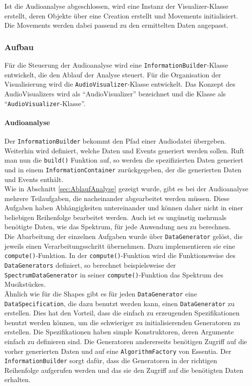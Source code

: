\documentclass[11pt,a4paper]{article}
\begin{document}
Ist die Audioanalyse abgeschlossen, wird eine Instanz der Visualizer-Klasse erstellt, deren Objekte über eine Creation erstellt und Movements initialisiert. Die Movements werden dabei passend zu den ermittelten Daten angepasst.

\subsubsection{Aufbau}
Für die Steuerung der Audioanalyse wird eine \lstinline!InformationBuilder!-Klasse entwickelt, die den Ablauf der Analyse steuert. Für die Organisation der Visualisierung wird die \lstinline!AudioVisualizer!-Klasse entwickelt. Das Konzept des AudioVisualizers wird als ``AudioVisualizer'' bezeichnet und die Klasse als ``\lstinline!AudioVisualizer!-Klasse''.

\paragraph{Audioanalyse}
Der \lstinline!InformationBuilder! bekommt den Pfad einer Audiodatei übergeben. Weiterhin wird definiert, welche Daten und Events generiert werden sollen. Ruft man nun die \lstinline!build()! Funktion auf, so werden die spezifizierten Daten generiert und in einem \lstinline!InformationContainer! zurückgegeben, der die generierten Daten und Events enthält.\\
Wie in Abschnitt \ref{sec:AblaufAnalyse} gezeigt wurde, gibt es bei der Audioanalyse mehrere Teilaufgaben, die nacheinander abgearbeitet werden müssen. Diese Aufgaben haben Abhängigkeiten untereinander und können daher nicht in einer beliebigen Reihenfolge bearbeitet werden. Auch ist es ungünstig mehrmals benötigte Daten, wie das Spektrum, für jede Anwendung neu zu berechnen.\\
Die Abarbeitung der einzelnen Aufgaben wurde über \lstinline!DataGenerator! gelöst, die jeweils einen Verarbeitungsschritt übernehmen. Dazu implementieren sie eine \lstinline!compute()!-Funktion. In der \lstinline!compute()!-Funktion wird die Funktionsweise des \lstinline!DataGenerators! definiert, so berechnet beispielsweise der \lstinline!SpectrumDataGenerator! in seiner \lstinline!compute()!-Funktion das Spektrum des Musikstückes.\\
Ähnlich wie für die Shapes gibt es für jeden \lstinline!DataGenerator! eine \lstinline!DataSpecification!, die dazu benutzt werden kann, einen \lstinline!DataGenerator! zu erstellen. Dies hat den Vorteil, dass die einfach zu erzeugenden Spezifikationen benutzt werden können, um die schwieriger zu initialisierenden Generatoren zu erstellen. Die Spezifikationen haben simple Konstruktoren, deren Argumente einfach zu definieren sind. Die Generatoren andererseits benötigen Zugriff auf die vorher generierten Daten und auf eine \lstinline!AlgorithmFactory! von Essentia. Der \lstinline!InformationBuilder! sorgt dafür, dass die Generatoren in der richtigen Reihenfolge aufgerufen werden und das sie den Zugriff auf die benötigten Daten erhalten.\\
\end{document}
